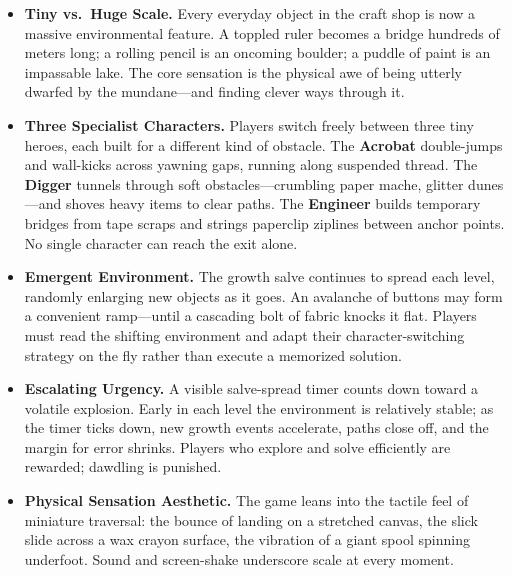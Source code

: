 \documentclass[11pt, letterpaper]{article}
\begin{document}
\begin{itemize}[leftmargin=1.5em, itemsep=3pt]

    \item \textbf{Tiny vs.\ Huge Scale.} Every everyday object in the craft shop is now a massive
    environmental feature. A toppled ruler becomes a bridge hundreds of meters long; a rolling
    pencil is an oncoming boulder; a puddle of paint is an impassable lake. The core sensation is
    the physical awe of being utterly dwarfed by the mundane---and finding clever ways through it.

    \item \textbf{Three Specialist Characters.} Players switch freely between three tiny heroes,
    each built for a different kind of obstacle. The \textbf{Acrobat} double-jumps and wall-kicks
    across yawning gaps, running along suspended thread. The \textbf{Digger} tunnels through soft
    obstacles---crumbling paper mache, glitter dunes---and shoves heavy items to clear paths. The
    \textbf{Engineer} builds temporary bridges from tape scraps and strings paperclip ziplines
    between anchor points. No single character can reach the exit alone.

    \item \textbf{Emergent Environment.} The growth salve continues to spread each level, randomly
    enlarging new objects as it goes. An avalanche of buttons may form a convenient ramp---until a
    cascading bolt of fabric knocks it flat. Players must read the shifting environment and adapt
    their character-switching strategy on the fly rather than execute a memorized solution.

    \item \textbf{Escalating Urgency.} A visible salve-spread timer counts down toward a volatile
    explosion. Early in each level the environment is relatively stable; as the timer ticks down,
    new growth events accelerate, paths close off, and the margin for error shrinks. Players who
    explore and solve efficiently are rewarded; dawdling is punished.

    \item \textbf{Physical Sensation Aesthetic.} The game leans into the tactile feel of miniature
    traversal: the bounce of landing on a stretched canvas, the slick slide across a wax crayon
    surface, the vibration of a giant spool spinning underfoot. Sound and screen-shake underscore
    scale at every moment.

\end{itemize}
\end{document}
